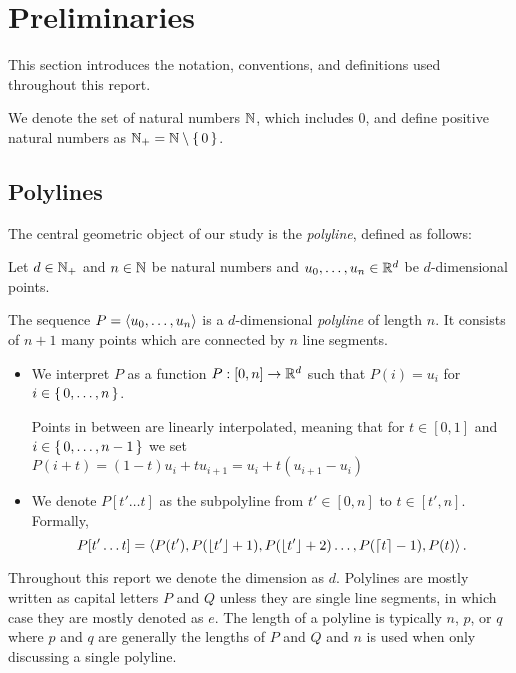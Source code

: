 \section{Preliminaries}
\label{sec:preliminaries}

This section introduces the notation, conventions, and definitions used throughout this report.  

We denote the set of natural numbers \(\mathbb{N}\), which includes \(0\), and define positive natural numbers as \(\mathbb{N}_+ = \mathbb{N} \setminus\set{0}\).

\subsection{Polylines}
\label{ssec:polylines}

The central geometric object of our study is the \emph{polyline}, defined as follows:

\begin{definition}[Polyline]
  Let \(d\in \mathbb{N}_+\) and \(n \in \mathbb{N}\) be natural numbers and \(u_0, \dots, u_n \in \mathbb{R}^d\) be \(d\)-dimensional points. 

  The sequence \(P = \left\langle u_0, \dots, u_n\right\rangle\) is a \(d\)-dimensional \emph{polyline} of length \(n\). It consists of \(n+1\) many points which are connected by \(n\) line segments. 
  \begin{itemize}
    \item We interpret \(P\) as a function \(P:[0,n] \to \mathbb{R}^d\) such that \(P(i) = u_i\) for \(i \in \set{0, \dots, n}\).

      Points in between are linearly interpolated, meaning that for \(t \in [0, 1]\) and \(i \in \set{0, \dots, n - 1}\) we set \(P(i + t) = (1- t)u_i + t u_{i+1} = u_i + t(u_{i+1} - u_i)\)
    \item We denote \(P[t'\dots t]\) as the subpolyline from \(t' \in [0, n]\) to \(t \in [t', n]\). Formally, \[P[t'\dots t] = \left\langle P(t'), P(\left\lfloor t'\right\rfloor + 1),  P(\left\lfloor t'\right\rfloor + 2) \dots, P(\left\lceil t\right\rceil - 1), P(t)\right\rangle.\]
  \end{itemize}

\end{definition}
Throughout this report we denote the dimension as \(d\). Polylines are mostly written as capital letters \(P\) and \(Q\) unless they are single line segments, in which case they are mostly denoted as \(e\). The length of a polyline is typically \(n\), \(p\), or \(q\) where \(p\) and \(q\) are generally the lengths of \(P\) and \(Q\) and \(n\) is used when only discussing a single polyline.


